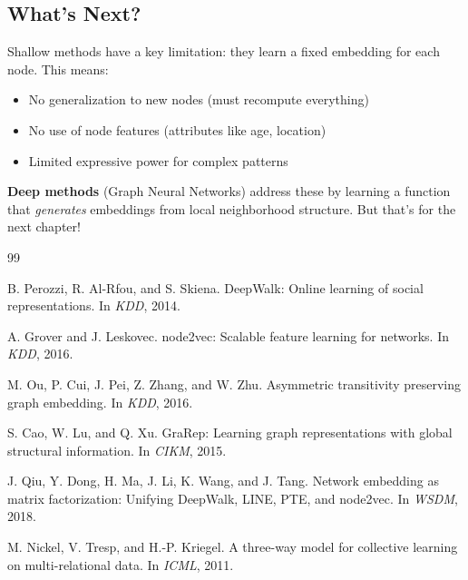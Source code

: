 \begin{notechapter}
\subsection{What's Next?}

Shallow methods have a key limitation: they learn a fixed embedding for each node. This means:
\begin{itemize}
    \item No generalization to new nodes (must recompute everything)
    \item No use of node features (attributes like age, location)
    \item Limited expressive power for complex patterns
\end{itemize}

\textbf{Deep methods} (Graph Neural Networks) address these by learning a function that \emph{generates} embeddings from local neighborhood structure. But that's for the next chapter!


\begin{thebibliography}{99}

B. Perozzi, R. Al-Rfou, and S. Skiena.
\newblock DeepWalk: Online learning of social representations.
\newblock In \emph{KDD}, 2014.

A. Grover and J. Leskovec.
\newblock node2vec: Scalable feature learning for networks.
\newblock In \emph{KDD}, 2016.

M. Ou, P. Cui, J. Pei, Z. Zhang, and W. Zhu.
\newblock Asymmetric transitivity preserving graph embedding.
\newblock In \emph{KDD}, 2016.

S. Cao, W. Lu, and Q. Xu.
\newblock GraRep: Learning graph representations with global structural information.
\newblock In \emph{CIKM}, 2015.

J. Qiu, Y. Dong, H. Ma, J. Li, K. Wang, and J. Tang.
\newblock Network embedding as matrix factorization: Unifying DeepWalk, LINE, PTE, and node2vec.
\newblock In \emph{WSDM}, 2018.

M. Nickel, V. Tresp, and H.-P. Kriegel.
\newblock A three-way model for collective learning on multi-relational data.
\newblock In \emph{ICML}, 2011.


\end{thebibliography}
\end{notechapter}
